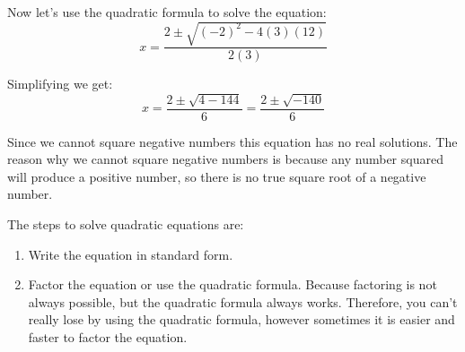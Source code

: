 Now let's use the quadratic formula to solve the equation:
$$x=\frac{2\pm\sqrt{(-2)^2-4(3)(12)}}{2(3)}$$

Simplifying we get:
$$x=\frac{2\pm\sqrt{4-144}}{6} = \frac{2\pm\sqrt{-140}}{6}$$

Since we cannot square negative numbers this equation has no real solutions. 
The reason why we cannot square negative numbers is because any number squared will produce a positive number, so there is no true square root of a negative number.

The steps to solve quadratic equations are:
\begin{enumerate}
    \item Write the equation in standard form.
    \item Factor the equation or use the quadratic formula. Because factoring is not always possible, but the quadratic formula always works. Therefore, you can't really lose by using the quadratic formula, however sometimes it is easier and faster to factor the equation.
\end{enumerate}